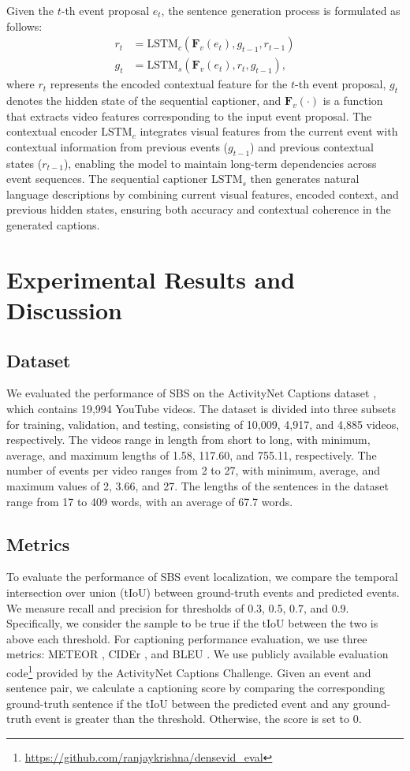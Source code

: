 Given the $t$-th event proposal $e_t$, the sentence generation process is formulated as follows:
\begin{align}
  r_t &= \text{LSTM}_c(\mathbf{F}_v(e_t), g_{t-1}, r_{t-1}) \\
  g_t &= \text{LSTM}_s(\mathbf{F}_v(e_t), r_t, g_{t-1}),
\end{align}
where $r_t$ represents the encoded contextual feature for the $t$-th event proposal, $g_t$ denotes the hidden state of the sequential captioner, and $\mathbf{F}_v(\cdot)$ is a function that extracts video features corresponding to the input event proposal. The contextual encoder $\text{LSTM}_c$ integrates visual features from the current event with contextual information from previous events ($g_{t-1}$) and previous contextual states ($r_{t-1}$), enabling the model to maintain long-term dependencies across event sequences. The sequential captioner $\text{LSTM}_s$ then generates natural language descriptions by combining current visual features, encoded context, and previous hidden states, ensuring both accuracy and contextual coherence in the generated captions.

\section{Experimental Results and Discussion}
\subsection{Dataset}
\label{subsec:exp_dataset}
We evaluated the performance of SBS on the ActivityNet Captions dataset \cite{krishna2017dense}, which contains 19,994 YouTube videos.
The dataset is divided into three subsets for training, validation, and testing, consisting of 10,009, 4,917, and 4,885 videos, respectively.
The videos range in length from short to long, with minimum, average, and maximum lengths of 1.58, 117.60, and 755.11, respectively.
The number of events per video ranges from 2 to 27, with minimum, average, and maximum values of 2, 3.66, and 27.
The lengths of the sentences in the dataset range from 17 to 409 words, with an average of 67.7 words.

\subsection{Metrics}
To evaluate the performance of SBS event localization, we compare the temporal intersection over union (tIoU) between ground-truth events and predicted events.
We measure recall and precision for thresholds of 0.3, 0.5, 0.7, and 0.9. Specifically, we consider the sample to be true if the tIoU between the two is above each threshold.
For captioning performance evaluation, we use three metrics: METEOR \cite{banerjee2005meteor}, CIDEr \cite{vedantam2015cider}, and BLEU \cite{papineni2002bleu}.
We use publicly available evaluation code\footnote{\url{https://github.com/ranjaykrishna/densevid_eval}} provided by the ActivityNet Captions Challenge.
Given an event and sentence pair, we calculate a captioning score by comparing the corresponding ground-truth sentence if the tIoU between the predicted event and any ground-truth event is greater than the threshold. Otherwise, the score is set to 0.

